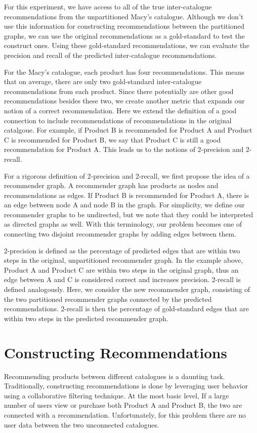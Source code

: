 \documentclass[11pt]{article}
\begin{document}
For this experiment, we have access to all of the true inter-catalogue 
recommendations from the unpartitioned Macy's catalogue. Although we don't
use this information for constructing recommendations between the partitioned 
graphs, we can use the original recommendations as a gold-standard to test the 
construct ones. Using these gold-standard recommendations, we can evaluate 
the precision and recall of the predicted inter-catalogue recommendations.

For the Macy's catalogue, each product has four recommendations. This means that
on average, there are only two gold-standard inter-catalogue recommendations
from each product. Since there potentially are other good
recommendations besides these two, we create another metric that expands our
notion of a correct recommendation. Here we extend the definition of a good
connection to include recommendations of recommendations in the original
catalgoue. For example, if Product B is recommended for Product A and 
Product C is recommended for Product B, we say that Product C is still a good 
recommendation for Product A. This leads us to the notions of 2-precision and 
2-recall.

For a rigorous definition of 2-precision and 2-recall, we first propose the idea
of a recommender graph. A recommender graph has products as nodes and
recommendations as edges. If Product B is recommended for Product A, there is an
edge between node A and node B in the graph. For simplicity, we define our
recommender graphs to be undirected, but we note that they could be interpreted
as directed graphs as well. With this terminology, our problem becomes one of
connecting two disjoint recommender graphs by adding edges between them. 

2-precision is defined as the percentage of predicted edges that are within two
steps in the original, unpartitioned recommender graph. In the example above,
Product A and Product C are within two steps in the original graph, thus an edge
between A and C is considered correct and increases precision. 2-recall is
defined analogously. Here, we consider the new recommender graph, consisting of
the two partitioned recommender graphs connected by the predicted
recommendations. 2-recall is then the percentage of gold-standard edges that 
are within two steps in the predicted recommender graph.

\section*{Constructing Recommendations}
Recommending products between different catalogues is a daunting task.
Traditionally, constructing recommendations is done by leveraging user behavior
using a collaborative filtering technique. At the most basic level, If a large
number of users view or purchase both Product A and Product B, the two are
connected with a recommendation. Unfortunately, for this problem there are no
user data between the two unconnected catalogues.
\end{document}
